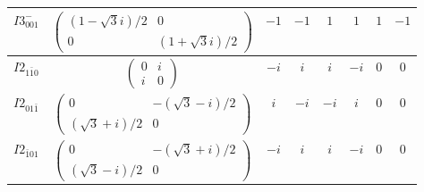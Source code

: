\documentclass[3p,preprint]{elsarticle}
\begin{document}
\begin{table}[H]
\begin{tabular}{|c|c||c|c|c|c|c|c|}
		$I3^{-}_{001}$ &		$\left(\begin{array}{cc} (1-\sqrt{3}i)/2&0 \\ 0&(1+\sqrt{3}i)/2 \end{array}\right)$ &$-1$ & $-1$ & $1$ & $1$ & $1$ & $-1$ \\ \hline
		$I2_{1\bar{1}0}$ &					$\left(\begin{array}{cc} 0&i \\ i&0 \end{array}\right)$ &$-i$ & $i$ & $i$ & $-i$ & $0$ & $0$ \\ \hline
		$I2_{01\bar{1}}$ &				$\left(\begin{array}{cc} 0&-(\sqrt{3}-i)/2 \\ (\sqrt{3}+i)/2&0 \end{array}\right)$ &$i$ & $-i$ & $-i$ & $i$ & $0$ & $0$ \\ \hline
		$I2_{\bar{1}01}$ &		$\left(\begin{array}{cc} 0&-(\sqrt{3}+i)/2 \\ (\sqrt{3}-i)/2&0 \end{array}\right)$ &$-i$ & $i$ & $i$ & $-i$ & $0$ & $0$ \\ \hline
	\end{tabular}
\end{table}
\end{document}
